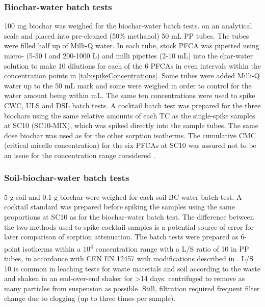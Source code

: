 \subsubsection{Biochar-water batch tests}
100 mg biochar was weighed for the biochar-water batch tests. on an analytical scale and placed into pre-cleaned (50\% methanol) 50 mL PP tubes. The tubes were filled half up of Milli-Q water. In each tube, stock PFCA was pipetted using micro- (5-50 {\textmu}l and 200-1000 {\textmu}L) and milli pipettes (2-10 mL) into the char-water solution to make 10 dilutions for each of the 6 PFCAs in even intervals within the concentration points in \cref{tab:spikeConcentrations}. Some tubes were added Milli-Q water up to the 50 mL mark and some were weighed in order to control for the water amount being within  mL. The same ten concentrations were used to spike CWC, ULS and DSL batch tests. A cocktail batch test was prepared for the three biochars using the same relative amounts of each TC as the single-spike samples at SC10 (SC10-MIX), which was spiked directly into the sample tubes. The same dose biochar was used as for the other sorption isotherms. The cumulative CMC (critical micelle concentration) for the six PFCAs at SC10 was assured not to be an issue for the concentration range considered \citep{bhhatarai2011,ding2013physicochemical}.

\subsubsection{Soil-biochar-water batch tests}\label{sec:S-BC}
5 g soil and 0.1 g biochar were weighed for each soil-BC-water batch test. A cocktail standard was prepared before spiking the samples using the same proportions at SC10 as for the biochar-water batch test. The difference between the two methods used to spike cocktail samples is a potential source of error for later comparison of sorption attenuation. 
The batch tests were prepared as 6-point isotherms within a 10\textsuperscript{4} concentration range with a L/S ratio of 10 in PP tubes, in accordance with CEN EN 12457 with modifications described in \citep{Hale2017fire,Kupryianchyk2016a}. L/S 10  is common in leaching tests for waste materials and soil according to the waste and shaken in an end-over-end shaker for \textgreater 14 days. 
centrifuged to remove as many particles from suspension as possible. Still, filtration required frequent filter change due to clogging (up to three times per sample).


